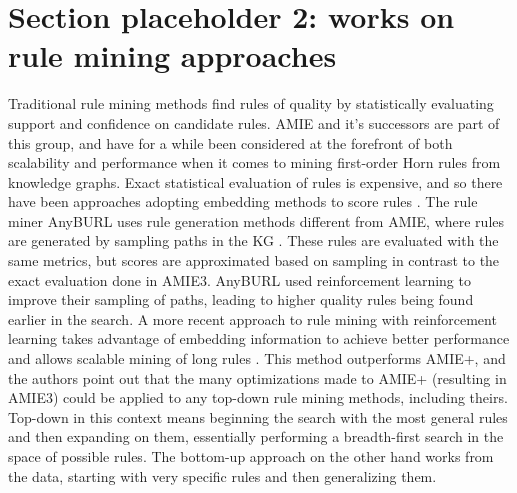 \section{Section placeholder 2: works on rule mining approaches}
Traditional rule mining methods find rules of quality by statistically evaluating support and confidence on candidate rules. AMIE and it's successors are part of this group, and have for a while been considered at the forefront of both scalability and performance when it comes to mining first-order Horn rules from knowledge graphs. Exact statistical evaluation of rules is expensive, and so there have been approaches adopting embedding methods to score rules \cite{yang2014embedding, omran2018scalable, omran2019embedding}. The rule miner AnyBURL uses rule generation methods different from AMIE, where rules are generated by sampling paths in the KG \cite{meilicke2020reinforced}. These rules are evaluated with the same metrics, but scores are approximated based on sampling in contrast to the exact evaluation done in AMIE3. AnyBURL used reinforcement learning to improve their sampling of paths, leading to higher quality rules being found earlier in the search. A more recent approach to rule mining with reinforcement learning takes advantage of embedding information to achieve better performance and allows scalable mining of long rules \cite{chen2022rule}. This method outperforms AMIE+, and the authors point out that the many optimizations made to AMIE+ (resulting in AMIE3) could be applied to any top-down rule mining methods, including theirs. Top-down in this context means beginning the search with the most general rules and then expanding on them, essentially performing a breadth-first search in the space of possible rules. The bottom-up approach on the other hand works from the data, starting with very specific rules and then generalizing them.


